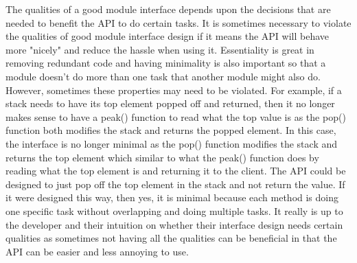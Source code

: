 \documentclass[12pt]{article}
\begin{document}
The qualities of a good module interface depends upon the decisions that are needed to benefit the API to do certain tasks. It is sometimes necessary to violate the qualities of good module interface design if it means the API will behave more "nicely" and reduce the hassle when using it. Essentiality is great in removing redundant code and having minimality is also important so that a module doesn't do more than one task that another module might also do. However, sometimes these properties may need to be violated. For example, if a stack needs to have its top element popped off and returned, then it no longer makes sense to have a peak() function to read what the top value is as the pop() function both modifies the stack and returns the popped element. In this case, the interface is no longer minimal as the pop() function modifies the stack and returns the top element which similar to what the peak() function does by reading what the top element is and returning it to the client. The API could be designed to just pop off the top element in the stack and not return the value. If it were designed this way, then yes, it is minimal because each method is doing one specific task without overlapping and doing multiple tasks. It really is up to the developer and their intuition on whether their interface design needs certain qualities as sometimes not having all the qualities can be beneficial in that the API can be easier and less annoying to use.
\end{document}
